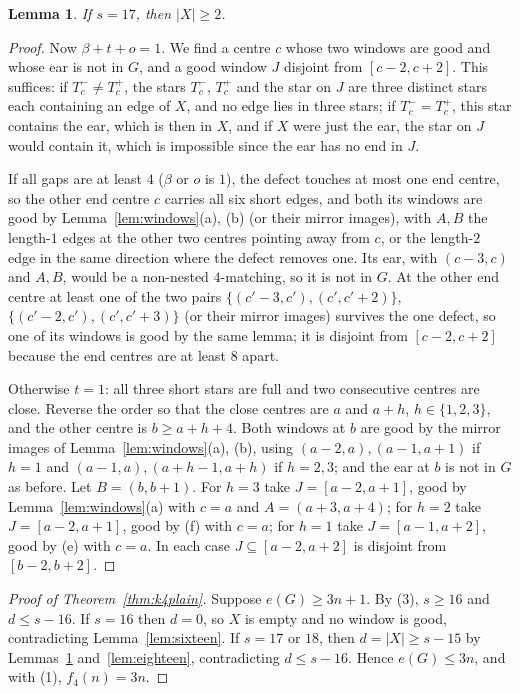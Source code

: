 \documentclass[11pt]{amsart}
\newtheorem{lemma}[theorem]{Lemma}
\theoremstyle{definition}\newtheorem{problem}{Problem}
\theoremstyle{remark}\newtheorem*{remark}{Remark}
\begin{document}
\begin{lemma}\label{lem:seventeen}
If $s=17$, then $|X|\ge2$.
\end{lemma}

\begin{proof}
Now $\beta+t+o=1$. We find a centre $c$ whose two windows are good and whose ear is not in $G$, and a good window $J$
disjoint from $[c-2,c+2]$. This suffices: if $T^-_c\ne T^+_c$, the stars $T^-_c$, $T^+_c$ and the star on $J$ are three
distinct stars each containing an edge of $X$, and no edge lies in three stars; if $T^-_c=T^+_c$, this star contains
the ear, which is then in $X$, and if $X$ were just the ear, the star on $J$ would contain it, which is impossible since
the ear has no end in $J$.

If all gaps are at least $4$ ($\beta$ or $o$ is $1$), the defect touches at most one end centre, so the other end
centre $c$ carries all six short edges, and both its windows are good by Lemma~\ref{lem:windows}(a), (b) (or their
mirror images), with $A,B$ the length-$1$ edges at the other two centres pointing away from $c$, or the length-$2$ edge
in the same direction where the defect removes one. Its ear, with $(c-3,c)$ and $A,B$, would be a non-nested
$4$-matching, so it is not in $G$. At the other end centre at least one of the two pairs $\{(c'-3,c'),(c',c'+2)\}$,
$\{(c'-2,c'),(c',c'+3)\}$ (or their mirror images) survives the one defect, so one of its windows is good by the same
lemma; it is disjoint from $[c-2,c+2]$ because the end centres are at least $8$ apart.

Otherwise $t=1$: all three short stars are full and two consecutive centres are close. Reverse the order so that the
close centres are $a$ and $a+h$, $h\in\{1,2,3\}$, and the other centre is $b\ge a+h+4$. Both windows at $b$ are good by
the mirror images of Lemma~\ref{lem:windows}(a), (b), using $(a-2,a),(a-1,a+1)$ if $h=1$ and $(a-1,a),(a+h-1,a+h)$ if
$h=2,3$; and the ear at $b$ is not in $G$ as before. Let $B=(b,b+1)$. For $h=3$ take $J=[a-2,a+1]$, good by
Lemma~\ref{lem:windows}(a) with $c=a$ and $A=(a+3,a+4)$; for $h=2$ take $J=[a-2,a+1]$, good by (f) with $c=a$; for
$h=1$ take $J=[a-1,a+2]$, good by (e) with $c=a$. In each case $J\subseteq[a-2,a+2]$ is disjoint from $[b-2,b+2]$.
\end{proof}

\begin{proof}[Proof of Theorem~\ref{thm:k4plain}]
Suppose $e(G)\ge3n+1$. By (3), $s\ge16$ and $d\le s-16$. If $s=16$ then $d=0$, so $X$ is empty and no window is good,
contradicting Lemma~\ref{lem:sixteen}. If $s=17$ or $18$, then $d=|X|\ge s-15$ by Lemmas~\ref{lem:seventeen}
and~\ref{lem:eighteen}, contradicting $d\le s-16$. Hence $e(G)\le3n$, and with (1), $f_4(n)=3n$.
\end{proof}
\end{document}
